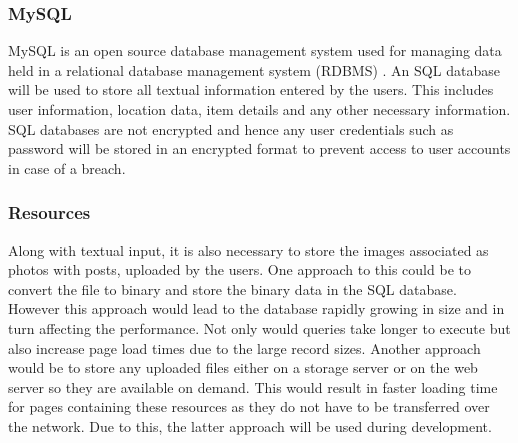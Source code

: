 \subsubsection{MySQL} 
MySQL is an open source database management system used for managing data held in a relational database management system (RDBMS) \cite{MySQL:Home}. An SQL database will be used to store all textual information entered by the users. This includes user information, location data, item details and any other necessary information. SQL databases are not encrypted and hence any user credentials such as password will be stored in an encrypted format to prevent access to user accounts in case of a breach.

\subsubsection{Resources}
Along with textual input, it is also necessary to store the images associated as photos with posts, uploaded by the users. One approach to this could be to convert the file to binary and store the binary data in the SQL database. However this approach would lead to the database rapidly growing in size and in turn affecting the performance. Not only would queries take longer to execute but also increase page load times due to the large record sizes. Another approach would be to store any uploaded files either on a storage server or on the web server so they are available on demand. This would result in faster loading time for pages containing these resources as they do not have to be transferred over the network. Due to this, the latter approach will be used during development.